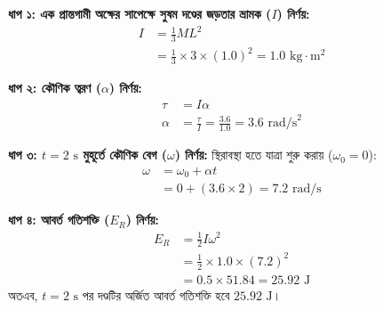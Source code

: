 \documentclass[12pt, a4paper]{article}
\begin{document}
\begin{tcolorbox}[solutionbox={সমাধান (Solution)}]
\noindent
\textbf{ধাপ ১: এক প্রান্তগামী অক্ষের সাপেক্ষে সুষম দণ্ডের জড়তার ভ্রামক ($I$) নির্ণয়:}
\begin{align*}
    I &= \frac{1}{3} M L^2 \\
      &= \frac{1}{3} \times 3 \times (1.0)^2 = \mathbf{1.0}\text{ kg}\cdot\text{m}^2
\end{align*}

\vspace{0.5em}
\textbf{ধাপ ২: কৌণিক ত্বরণ ($\alpha$) নির্ণয়:}
\begin{align*}
    \tau &= I \alpha \\
    \alpha &= \frac{\tau}{I} = \frac{3.6}{1.0} = \mathbf{3.6}\text{ rad/s}^2
\end{align*}

\vspace{0.5em}
\textbf{ধাপ ৩: $t = 2\text{ s}$ মুহূর্তে কৌণিক বেগ ($\omega$) নির্ণয়:}
স্থিরাবস্থা হতে যাত্রা শুরু করায় ($\omega_0 = 0$):
\begin{align*}
    \omega &= \omega_0 + \alpha t \\
           &= 0 + (3.6 \times 2) = \mathbf{7.2}\text{ rad/s}
\end{align*}

\vspace{0.5em}
\textbf{ধাপ ৪: আবর্ত গতিশক্তি ($E_R$) নির্ণয়:}
\begin{align*}
    E_R &= \frac{1}{2} I \omega^2 \\
        &= \frac{1}{2} \times 1.0 \times (7.2)^2 \\
        &= 0.5 \times 51.84 = \mathbf{25.92}\text{ J}
\end{align*}
অতএব, $t = 2\text{ s}$ পর দণ্ডটির অর্জিত আবর্ত গতিশক্তি হবে $25.92\text{ J}$।
\end{tcolorbox}
\end{document}
